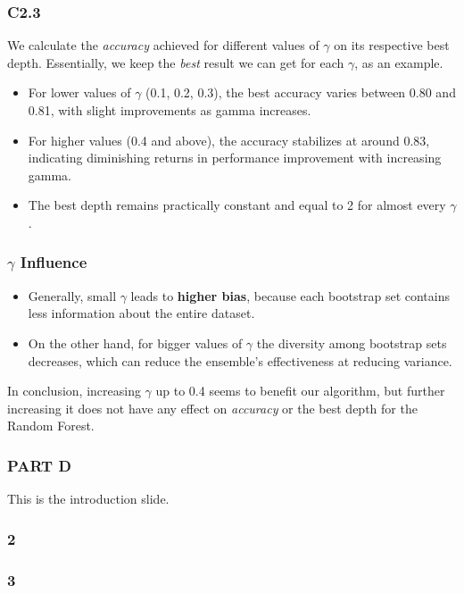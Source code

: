 \documentclass{beamer}
\begin{document}
\begin{frame}
\frametitle{C2.3}

We calculate the \textit{accuracy} achieved for different values of $\gamma$ on its respective best depth. Essentially, we keep the \textit{best} result we can get for each $\gamma$, as an example. 

\begin{itemize}
    \item For lower values of $\gamma$ (0.1, 0.2, 0.3), the best accuracy varies between 0.80 and 0.81, with slight improvements as gamma increases. 
    \item For higher values (0.4 and above), the accuracy stabilizes at around 0.83, indicating diminishing returns in performance improvement with increasing gamma. 
    \item The best depth remains practically constant and equal to 2 for almost every $\gamma$.
\end{itemize}

\end{frame}

\begin{frame}
\frametitle{$\gamma$ Influence}
\begin{itemize}
    \item Generally, small $\gamma$ leads to \textbf{higher bias}, because each bootstrap set contains less information about the entire dataset.
    \item On the other hand, for bigger values of $\gamma$ the diversity among bootstrap sets decreases, which can reduce the ensemble's effectiveness at reducing variance.
\end{itemize}
\vspace{0.5cm}
In conclusion, increasing $\gamma$ up to 0.4 seems to benefit our algorithm, but further increasing it does not have any effect on \textit{accuracy} or the best depth for the Random Forest.
\end{frame}


\begin{frame}
\frametitle{PART D}
This is the introduction slide.
\end{frame}

\begin{frame}
\frametitle{2}

\end{frame}

\begin{frame}
\frametitle{3}

\end{frame}
\end{document}
